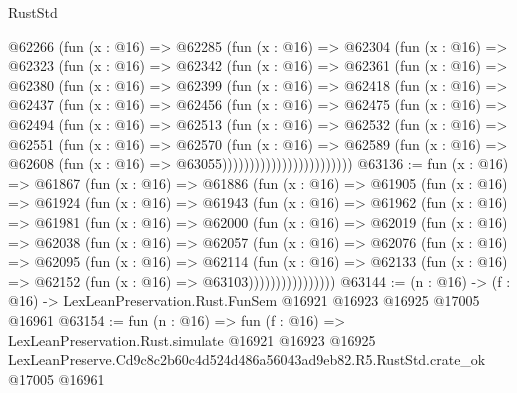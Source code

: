 \begin{lexlean}{RustStd}
\begin{coremodule}
            @62266
              (fun (x : @16) =>
              @62285
                (fun (x : @16) =>
                @62304
                  (fun (x : @16) =>
                  @62323
                    (fun (x : @16) =>
                    @62342
                      (fun (x : @16) =>
                      @62361
                        (fun (x : @16) =>
                        @62380
                          (fun (x : @16) =>
                          @62399
                            (fun (x : @16) =>
                            @62418
                              (fun (x : @16) =>
                              @62437
                                (fun (x : @16) =>
                                @62456
                                  (fun (x : @16) =>
                                  @62475
                                    (fun (x : @16) =>
                                    @62494
                                      (fun (x : @16) =>
                                      @62513
                                        (fun (x : @16) =>
                                        @62532
                                          (fun (x : @16) =>
                                          @62551
                                            (fun (x : @16) =>
                                            @62570
                                              (fun (x : @16) =>
                                              @62589
                                                (fun (x : @16) =>
                                                @62608
                                                  (fun (x : @16) => @63055))))))))))))))))))))))))
@63136 := fun (x : @16) =>
  @61867
    (fun (x : @16) =>
    @61886
      (fun (x : @16) =>
      @61905
        (fun (x : @16) =>
        @61924
          (fun (x : @16) =>
          @61943
            (fun (x : @16) =>
            @61962
              (fun (x : @16) =>
              @61981
                (fun (x : @16) =>
                @62000
                  (fun (x : @16) =>
                  @62019
                    (fun (x : @16) =>
                    @62038
                      (fun (x : @16) =>
                      @62057
                        (fun (x : @16) =>
                        @62076
                          (fun (x : @16) =>
                          @62095
                            (fun (x : @16) =>
                            @62114
                              (fun (x : @16) =>
                              @62133
                                (fun (x : @16) => @62152 (fun (x : @16) => @63103))))))))))))))))
@63144 := (n : @16) ->
  (f : @16) -> LexLeanPreservation.Rust.FunSem @16921 @16923 @16925 @17005 @16961
@63154 := fun (n : @16) =>
  fun (f : @16) =>
  LexLeanPreservation.Rust.simulate
    @16921
    @16923
    @16925
    LexLeanPreserve.Cd9c8c2b60c4d524d486a56043ad9eb82.R5.RustStd.crate_ok
    @17005
    @16961
\end{coremodule}
\end{lexlean}
